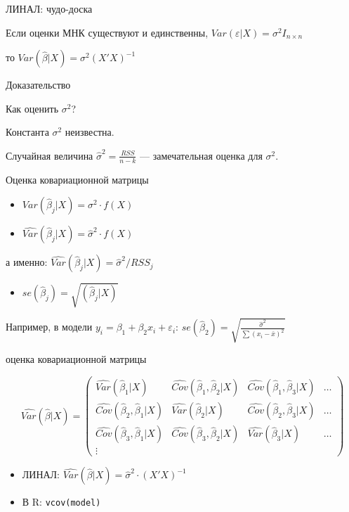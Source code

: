\documentclass[ignorenonframetext,]{beamer}
\begin{document}
\begin{frame}{ЛИНАЛ: чудо-доска}

Если оценки МНК существуют и единственны,
$Var(\varepsilon|X)=\sigma^2 I_{n\times n}$

то $Var(\hat{\beta}|X)=\sigma^2 (X'X)^{-1}$

Доказательство

\end{frame}

\begin{frame}{Как оценить $\sigma^2$?}

Константа $\sigma^2$ неизвестна.

Случайная величина $\hat{\sigma}^2=\frac{RSS}{n-k}$ --- замечательная
оценка для $\sigma^2$.

\end{frame}

\begin{frame}{Оценка ковариационной матрицы}

\begin{itemize}
\item
  $Var(\hat{\beta}_j | X)=\sigma^2 \cdot f(X)$
\item
  $\widehat{Var}(\hat{\beta}_j | X)=\hat{\sigma}^2 \cdot f(X)$
\end{itemize}

а именно: $\widehat{Var}(\hat{\beta}_j| X)=\hat{\sigma}^2/RSS_j$

\begin{itemize}
\itemsep1pt\parskip0pt
\item
  $se(\hat{\beta}_j)=\sqrt{(\hat{\beta}_j | X)}$
\end{itemize}

Например, в модели $y_i=\beta_1 + \beta_2 x_i + \varepsilon_i$:
$se(\hat{\beta}_2)=\sqrt{\frac{\hat{\sigma}^2}{\sum (x_i-\bar{x})^2}}$

\end{frame}

\begin{frame}{оценка ковариационной матрицы}

\[
\widehat{Var}(\hat{\beta}|X)=\begin{pmatrix}
\widehat{Var}(\hat{\beta}_1|X) & \widehat{Cov}(\hat{\beta}_1,\hat{\beta}_2|X) & \widehat{Cov}(\hat{\beta}_1,\hat{\beta}_3|X) & \ldots \\
\widehat{Cov}(\hat{\beta}_2,\hat{\beta}_1|X) & \widehat{Var}(\hat{\beta}_2|X) &  \widehat{Cov}(\hat{\beta}_2,\hat{\beta}_3|X) & \ldots \\
\widehat{Cov}(\hat{\beta}_3,\hat{\beta}_1|X) & \widehat{Cov}(\hat{\beta}_3,\hat{\beta}_2|X) & \widehat{Var}(\hat{\beta}_3|X) &   \ldots \\
\vdots & & 
\end{pmatrix}
\]

\begin{itemize}
\item
  ЛИНАЛ:
  $\widehat{Var}(\hat{\beta} | X)=\hat{\sigma}^2 \cdot (X'X)^{-1}$
\item
  В R: \texttt{vcov(model)}
\end{itemize}

\end{frame}
\end{document}
